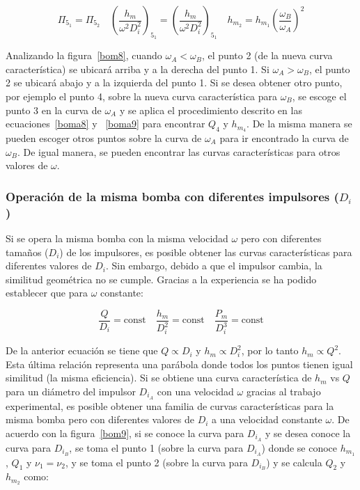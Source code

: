 \documentclass[11pt, oneside]{article}
\begin{document}
\begin{equation}
\Pi_{5_1} = \Pi_{5_2} \quad \left( \frac{h_m}{\omega^2 D_i^2} \right)_{5_1} = \left( \frac{h_m}{\omega^2 D_i^2} \right)_{5_1} \quad h_{m_2} = h_{m_1} \left(\frac{\omega_B}{\omega_A}\right)^2
\label{boma9}
\end{equation}


Analizando la figura~\ref{bom8}, cuando $\omega_A < \omega_B$, el punto 2 (de la nueva curva caracter\'istica) se ubicar\'a arriba y a la derecha del punto 1. Si $\omega_A > \omega_B$, el punto 2 se ubicar\'a abajo y a la izquierda del punto 1. Si se desea obtener otro punto, por ejemplo el punto 4, sobre la nueva curva caracter\'istica para $\omega_B$, se escoge el punto 3 en la curva de $\omega_A$ y se aplica el procedimiento descrito en las ecuaciones~\ref{boma8} y ~\ref{boma9} para encontrar $Q_4$ y $h_{m_4}$. De la misma manera se pueden escoger otros puntos sobre la curva de $\omega_A$ para ir encontrado la curva de $\omega_B$. De igual manera, se pueden encontrar las curvas caracter\'isticas para otros valores de $\omega$.


\subsubsection*{Operaci\'on de la misma bomba con diferentes impulsores ($D_i$)}
Si se opera la misma bomba con la misma velocidad $\omega$ pero con diferentes tama\~nos ($D_i$) de los impulsores, es posible obtener las curvas caracter\'isticas para diferentes valores de $D_i$. Sin embargo, debido a que el impulsor cambia, la similitud geom\'etrica no se cumple. Gracias a la experiencia se ha podido establecer que para $\omega$ constante:

\begin{equation}
\frac{Q}{D_i} = \text{const} \quad \frac{h_m}{D_i^2}= \text{const}  \quad \frac{P_m}{D_i^3}= \text{const} 
\label{boma7}
\end{equation}

De la anterior ecuaci\'on se tiene que $Q \propto D_i$ y $h_m \propto D_i^2$, por lo tanto $h_m \propto Q^2$. Esta \'ultima relaci\'on representa una par\'abola donde todos los puntos tienen igual similitud (la misma eficiencia). Si se obtiene una curva caracter\'istica de $h_m$ vs $Q$ para un di\'ametro del impulsor $D_{i_A}$ con una velocidad $\omega$ gracias al trabajo experimental, es posible obtener una familia de curvas caracter\'isticas para la misma bomba pero con diferentes valores de $D_i$ a una velocidad constante $\omega$. De acuerdo con la figura~\ref{bom9}, si se conoce la curva para $D_{i_A}$ y se desea conoce la curva para $D_{i_B}$, se toma el punto 1 (sobre la curva para $D_{i_A}$) donde se conoce $h_{m_1}$, $Q_1$ y $\nu_1 = \nu_2$, y se toma el punto 2 (sobre la curva para $D_{i_B}$) y se calcula $Q_2$ y $h_{m_2}$ como:
\end{document}
